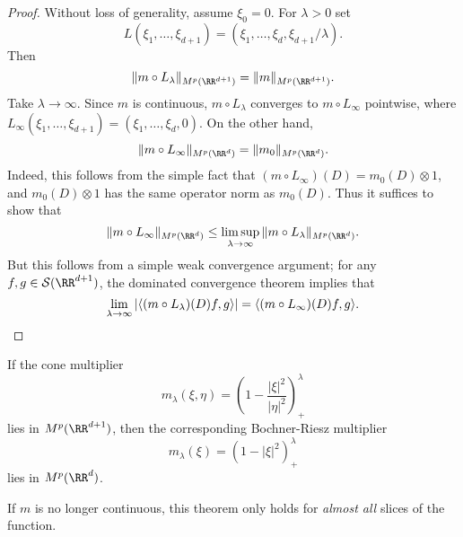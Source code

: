 \begin{proof}
  Without loss of generality, assume $\xi_0 = 0$. For $\lambda > 0$ set
  \[ L(\xi_1,\dots,\xi_{d+1}) = (\xi_1,\dots,\xi_d,\xi_{d+1}/\lambda). \]
  Then
  \[ \| m \circ L_\lambda \|_{M^p(\RR^{d+1})} = \| m \|_{M^p(\RR^{d+1})}. \]
  Take $\lambda \to \infty$. Since $m$ is continuous, $m \circ L_\lambda$ converges to $m \circ L_\infty$ pointwise, where $L_\infty(\xi_1,\dots,\xi_{d+1}) = (\xi_1,\dots,\xi_d,0)$. On the other hand,
  \[ \| m \circ L_\infty \|_{M^p(\RR^d)} = \| m_0 \|_{M^p(\RR^d)}. \]
  Indeed, this follows from the simple fact that $(m \circ L_\infty)(D) = m_0(D) \otimes 1$, and $m_0(D) \otimes 1$ has the same operator norm as $m_0(D)$. Thus it suffices to show that
  \[ \| m \circ L_\infty \|_{M^p(\RR^d)} \leq \limsup_{\lambda \to \infty} \| m \circ L_\lambda \|_{M^p(\RR^d)}. \]
  But this follows from a simple weak convergence argument; for any $f,g \in \mathcal{S}(\RR^{d+1})$, the dominated convergence theorem implies that
  \[ \lim_{\lambda \to \infty} |\langle (m \circ L_\lambda)(D) f, g \rangle| = \langle (m \circ L_\infty)(D) f, g \rangle. \qedhere \]
\end{proof}

\begin{example}
    If the cone multiplier
    \[ m_\lambda(\xi,\eta) = \left( 1 - \frac{|\xi|^2}{|\eta|^2} \right)^\lambda_+ \]
    lies in $M^p(\RR^{d+1})$, then the corresponding Bochner-Riesz multiplier
    \[ m_\lambda(\xi) = \left( 1 - |\xi|^2 \right)^\lambda_+ \]
    lies in $M^p(\RR^d)$.
\end{example}

If $m$ is no longer continuous, this theorem only holds for \emph{almost all} slices of the function.

